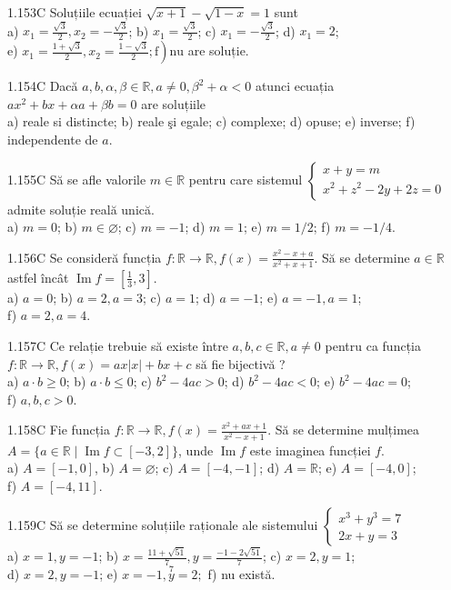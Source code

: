 \documentclass[11pt]{article}
\begin{document}
1.153C Soluțiile ecuației $\sqrt{x+1}-\sqrt{1-x}=1$ sunt\\ a) $x_{1}=\frac{\sqrt{3}}{2}, x_{2}=-\frac{\sqrt{3}}{2}$; b) $x_{1}=\frac{\sqrt{3}}{2}$; c) $x_{1}=-\frac{\sqrt{3}}{2}$; d) $x_{1}=2$;\\ e) $\left.x_{1}=\frac{1+\sqrt{3}}{2}, x_{2}=\frac{1-\sqrt{3}}{2} ; \mathrm{f}\right) \mathrm{nu}$ are soluție.

1.154C Dacă $a, b, \alpha, \beta \in \mathbb{R}, a \neq 0, \beta^{2}+\alpha<0$ atunci ecuația $a x^{2}+b x+\alpha a+\beta b=0$ are soluțiile\\ a) reale si distincte; b) reale şi egale; c) complexe; d) opuse; e) inverse; f) independente de $a$. 

1.155C Să se afle valorile $m \in \mathbb{R}$ pentru care sistemul $\left\{\begin{array}{l}x+y=m \\ x^{2}+z^{2}-2 y+2 z=0\end{array}\right.$\\admite soluție reală unică.\\ a) $m=0$; b) $m \in \varnothing$; c) $m=-1$; d) $m=1$; e) $m=1 / 2$; f) $m=-1 / 4$.

1.156C Se consideră funcția $f: \mathbb{R} \rightarrow \mathbb{R}, f(x)=\frac{x^{2}-x+a}{x^{2}+x+1}$. Să se determine $a \in \mathbb{R}$ astfel încât $\operatorname{Im} f=\left[\frac{1}{3}, 3\right]$.\\ a) $a=0$; b) $a=2, a=3$; c) $a=1$; d) $a=-1$; e) $a=-1, a=1$;\\ f) $a=2, a=4$.

1.157C Ce relație trebuie să existe între $a, b, c \in \mathbb{R}, a \neq 0$ pentru ca funcția $f: \mathbb{R} \rightarrow \mathbb{R}, f(x)=a x|x|+b x+c$ să fie bijectivă ?\\ a) $a \cdot b \geq 0$; b) $a \cdot b \leq 0$; c) $b^{2}-4 a c>0$; d) $b^{2}-4 a c<0$; e) $b^{2}-4 a c=0$;\\ f) $a, b, c>0$.

1.158C Fie funcția $f: \mathbb{R} \rightarrow \mathbb{R}, f(x)=\frac{x^{2}+a x+1}{x^{2}-x+1}$. Să se determine mulțimea $A=\{a \in \mathbb{R} \mid \operatorname{Im} f \subset[-3,2]\}$, unde $\operatorname{Im} f$ este imaginea funcției $f$.\\ a) $A=[-1,0]$, b) $A=\varnothing$; c) $A=[-4,-1]$; d) $A=\mathbb{R}$; e) $A=[-4,0]$;\\ f) $A=[-4,11]$.

1.159C Să se determine soluțiile raționale ale sistemului $\left\{\begin{array}{l}x^{3}+y^{3}=7 \\ 2 x+y=3\end{array}\right.$\\ a) $x=1, y=-1$; b) $x=\frac{11+\sqrt{51}}{7}, y=\frac{-1-2 \sqrt{51}}{7}$; c) $x=2, y=1$;\\ d) $x=2, y=-1$; e) $x=-1, \stackrel{7}{y}=2 ;$ f) nu există.
\end{document}
